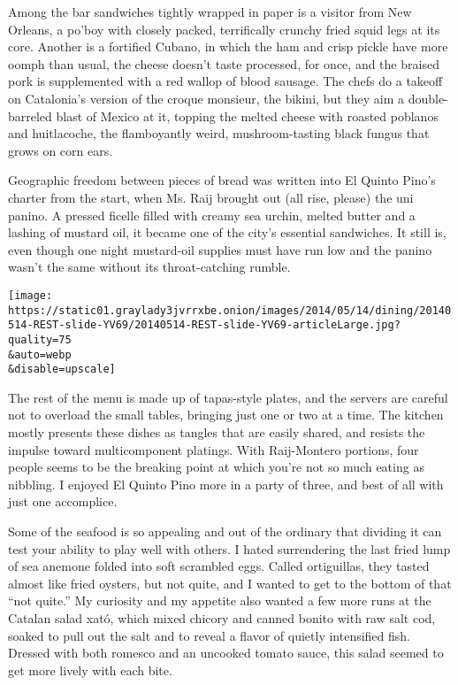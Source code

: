 Among the bar sandwiches tightly wrapped in paper is a visitor from New
Orleans, a po'boy with closely packed, terrifically crunchy fried squid
legs at its core. Another is a fortified Cubano, in which the ham and
crisp pickle have more oomph than usual, the cheese doesn't taste
processed, for once, and the braised pork is supplemented with a red
wallop of blood sausage. The chefs do a takeoff on Catalonia's version
of the croque monsieur, the bikini, but they aim a double-barreled blast
of Mexico at it, topping the melted cheese with roasted poblanos and
huitlacoche, the flamboyantly weird, mushroom-tasting black fungus that
grows on corn ears.

Geographic freedom between pieces of bread was written into El Quinto
Pino's charter from the start, when Ms. Raij brought out (all rise,
please) the uni panino. A pressed ficelle filled with creamy sea urchin,
melted butter and a lashing of mustard oil, it became one of the city's
essential sandwiches. It still is, even though one night mustard-oil
supplies must have run low and the panino wasn't the same without its
throat-catching rumble.

\texttt{[image: https://static01.graylady3jvrrxbe.onion/images/2014/05/14/dining/20140514-REST-slide-YV69/20140514-REST-slide-YV69-articleLarge.jpg?quality=75\\\&auto=webp\\\&disable=upscale]}

The rest of the menu is made up of tapas-style plates, and the servers
are careful not to overload the small tables, bringing just one or two
at a time. The kitchen mostly presents these dishes as tangles that are
easily shared, and resists the impulse toward multicomponent platings.
With Raij-Montero portions, four people seems to be the breaking point
at which you're not so much eating as nibbling. I enjoyed El Quinto Pino
more in a party of three, and best of all with just one accomplice.

Some of the seafood is so appealing and out of the ordinary that
dividing it can test your ability to play well with others. I hated
surrendering the last fried lump of sea anemone folded into soft
scrambled eggs. Called ortiguillas, they tasted almost like fried
oysters, but not quite, and I wanted to get to the bottom of that ``not
quite.'' My curiosity and my appetite also wanted a few more runs at the
Catalan salad xató, which mixed chicory and canned bonito with raw salt
cod, soaked to pull out the salt and to reveal a flavor of quietly
intensified fish. Dressed with both romesco and an uncooked tomato
sauce, this salad seemed to get more lively with each bite.

